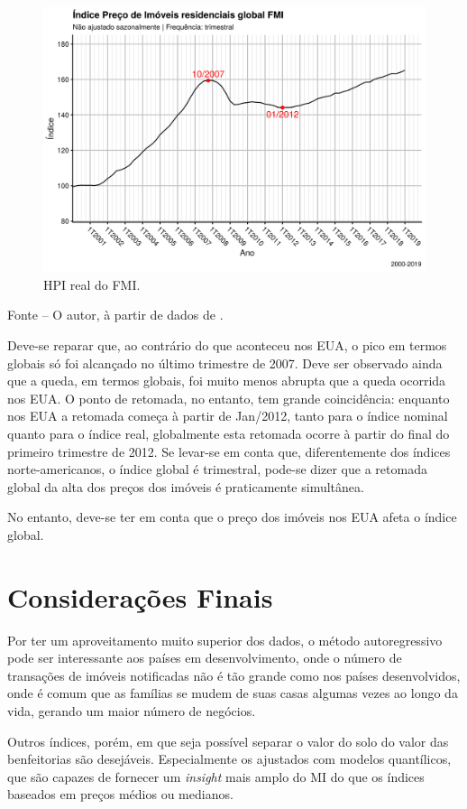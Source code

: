 \documentclass[
	12pt,				%
	oneside,			%
	a4paper,			%
	chapter=TITLE,		%
	section=TITLE,		%
	english,			%
	brazil				%
	]{abntex2}
\newcommand{\bcenter}{\begin{center}}
\newcommand{\ecenter}{\end{center}}
\begin{document}
\begin{refsection}
\begin{figure}[H]
{\centering \includegraphics[width=0.7\linewidth]{images/global-rhpi-1} 

}

\caption{HPI real do FMI.}\label{fig:global-rhpi}
\end{figure}
\bcenter

\small Fonte -- O autor, à partir de dados de \textcite{QuandlWIKI}.
\ecenter

Deve-se reparar que, ao contrário do que aconteceu nos \gls{EUA}, o pico em
termos globais só foi alcançado no último trimestre de 2007. Deve ser observado
ainda que a queda, em termos globais, foi muito menos abrupta que a queda
ocorrida nos \gls{EUA}. O ponto de retomada, no entanto, tem grande
coincidência: enquanto nos \gls{EUA} a retomada começa à partir de Jan/2012,
tanto para o índice nominal quanto para o índice real, globalmente esta retomada
ocorre à partir do final do primeiro trimestre de 2012. Se levar-se em conta
que, diferentemente dos índices norte-americanos, o índice global é trimestral,
pode-se dizer que a retomada global da alta dos preços dos imóveis é
praticamente simultânea.

No entanto, deve-se ter em conta que o preço dos imóveis nos \gls{EUA} afeta o
índice global.

\hypertarget{considerauxe7uxf5es-finais-2}{%
\section{Considerações Finais}\label{considerauxe7uxf5es-finais-2}}

Por ter um aproveitamento muito superior dos dados, o método autoregressivo pode
ser interessante aos países em desenvolvimento, onde o número de transações de
imóveis notificadas não é tão grande como nos países desenvolvidos, onde é comum
que as famílias se mudem de suas casas algumas vezes ao longo da vida, gerando um
maior número de negócios.

Outros índices, porém, em que seja possível separar o valor do solo do valor das
benfeitorias são desejáveis. Especialmente os ajustados com modelos quantílicos,
que são capazes de fornecer um \emph{insight} mais amplo do \gls{MI} do que os índices
baseados em preços médios ou medianos.

\printbibliography[heading=subbibintoc]
\end{refsection}
\end{document}
